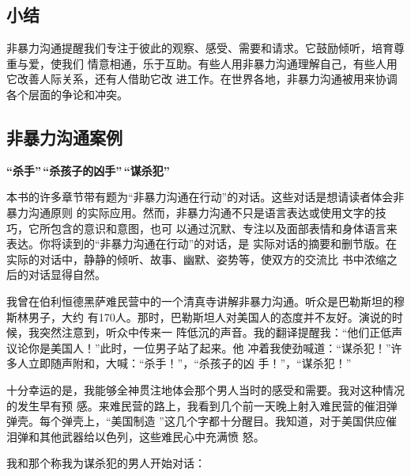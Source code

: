 \documentclass{ctexart}
\begin{document}
\subsection{小结}

非暴力沟通提醒我们专注于彼此的观察、感受、需要和请求。它鼓励倾听，培育尊重与爱，使我们
情意相通，乐于互助。有些人用非暴力沟通理解自己，有些人用它改善人际关系，还有人借助它改
进工作。在世界各地，非暴力沟通被用来协调各个层面的争论和冲突。

\subsection{非暴力沟通案例}

\textbf{``杀手''\,``杀孩子的凶手''\,``谋杀犯''}

本书的许多章节带有题为``非暴力沟通在行动''的对话。这些对话是想请读者体会非暴力沟通原则
的实际应用。然而，非暴力沟通不只是语言表达或使用文字的技巧，它所包含的意识和意图，也可
以通过沉默、专注以及面部表情和身体语言来表达。你将读到的``非暴力沟通在行动''的对话，是
实际对话的摘要和删节版。在实际的对话中，静静的倾听、故事、幽默、姿势等，使双方的交流比
书中浓缩之后的对话显得自然。

我曾在伯利恒德黑萨难民营中的一个清真寺讲解非暴力沟通。听众是巴勒斯坦的穆斯林男子，大约
有170人。那时，巴勒斯坦人对美国人的态度并不友好。演说的时候，我突然注意到，听众中传来一
阵低沉的声音。我的翻译提醒我：``他们正低声议论你是美国人！''此时，一位男子站了起来。他
冲着我使劲喊道：``谋杀犯！''许多人立即随声附和，大喊：``杀手！''，``杀孩子的凶
手！''，``谋杀犯！''

十分幸运的是，我能够全神贯注地体会那个男人当时的感受和需要。我对这种情况的发生早有预
感。来难民营的路上，我看到几个前一天晚上射入难民营的催泪弹弹壳。每个弹壳上，``美国制造
''这几个字都十分醒目。我知道，对于美国供应催泪弹和其他武器给以色列，这些难民心中充满愤
怒。

我和那个称我为谋杀犯的男人开始对话：
\end{document}
